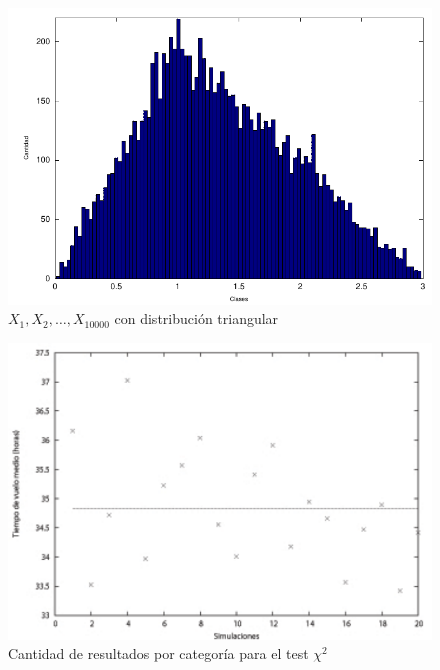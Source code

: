 \documentclass{sig-alternate}
\begin{document}
\begin{figure}[hp]
\centering
\includegraphics[scale=0.8]{graficos/triangular}
\caption{$X_{1}, X_{2}, \dots, X_{10000}$ con distribuci\'{o}n triangular}
\label{fig:triangular}
\end{figure}

\begin{figure}[hp]
\centering
\includegraphics[scale=0.8]{graficos/tiemposvuelo}
\caption{Cantidad de resultados por categor\'{i}a para el test $\chi^{2}$}
\label{fig:warp}
\end{figure}
\end{document}
